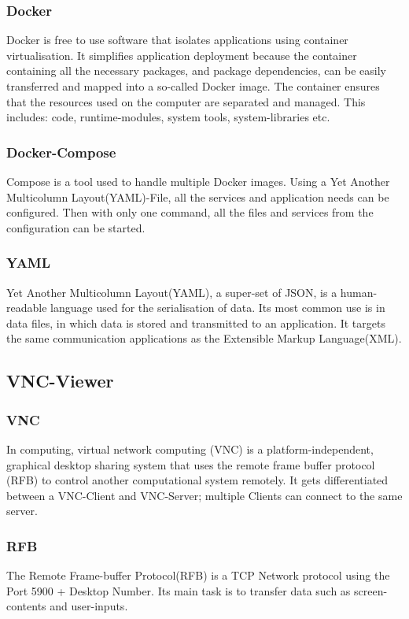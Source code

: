 \subsubsection{Docker}
Docker is free to use software that isolates applications using container virtualisation. It simplifies application deployment because the container containing all the necessary packages, and package dependencies, can be easily transferred and mapped into a so-called Docker image. The container ensures that the resources used on the computer are separated and managed. This includes: code, runtime-modules, system tools, system-libraries etc.

\subsubsection{Docker-Compose}
Compose is a tool used to handle multiple Docker images. Using a Yet Another Multicolumn Layout(YAML)-File, all the services and application needs can be configured. Then with only one command, all the files and services from the configuration can be started.

\subsubsection{YAML}
Yet Another Multicolumn Layout(YAML), a super-set of JSON, is a human-readable language used for the serialisation of data. Its most common use is in data files, in which data is stored and transmitted to an application. It targets the same communication applications as the Extensible Markup Language(XML). 

\subsection{VNC-Viewer}

\subsubsection{VNC}
In computing, virtual network computing (VNC) is a platform-independent, graphical desktop sharing system that uses the remote frame buffer protocol (RFB) to control another computational system remotely. It gets differentiated between a VNC-Client and VNC-Server; multiple Clients can connect to the same server.

\subsubsection{RFB}
The Remote Frame-buffer Protocol(RFB) is a TCP Network protocol using the Port 5900 + Desktop Number. Its main task is to transfer data such as screen-contents and user-inputs.

